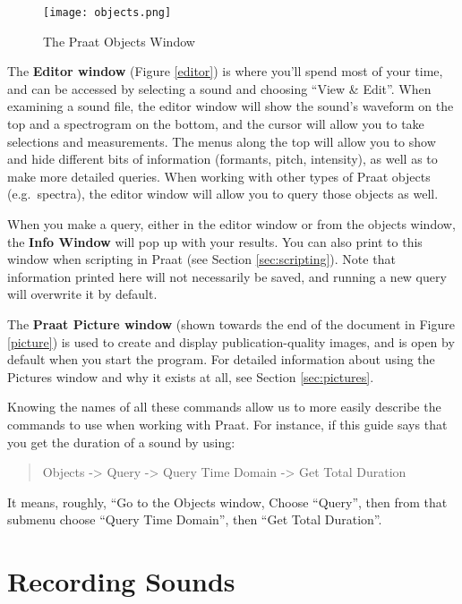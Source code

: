 \documentclass[11pt]{article}
\begin{document}
\begin{figure}
  \centerline{
    \mbox{\texttt{[image: objects.png]}}
  }
    \caption{The Praat Objects Window \label{objects}}
  
  \end{figure}

The \textbf{Editor window} (Figure \ref{editor}) is where you'll spend
most of your time, and can be accessed by selecting a sound and choosing
``View \& Edit''. When examining a sound file, the editor window will
show the sound's waveform on the top and a spectrogram on the bottom,
and the cursor will allow you to take selections and measurements. The
menus along the top will allow you to show and hide different bits of
information (formants, pitch, intensity), as well as to make more
detailed queries. When working with other types of Praat objects
(e.g.~spectra), the editor window will allow you to query those objects
as well.

When you make a query, either in the editor window or from the objects
window, the \textbf{Info Window} will pop up with your results. You can
also print to this window when scripting in Praat (see Section
\ref{sec:scripting}). Note that information printed here will not
necessarily be saved, and running a new query will overwrite it by
default.

The \textbf{Praat Picture window} (shown towards the end of the document
in Figure \ref{picture}) is used to create and display
publication-quality images, and is open by default when you start the
program. For detailed information about using the Pictures window and
why it exists at all, see Section \ref{sec:pictures}.

Knowing the names of all these commands allow us to more easily describe
the commands to use when working with Praat. For instance, if this guide
says that you get the duration of a sound by using:

\begin{quote}
Objects -\textgreater{} Query -\textgreater{} Query Time Domain
-\textgreater{} Get Total Duration
\end{quote}

It means, roughly, ``Go to the Objects window, Choose ``Query'', then
from that submenu choose ``Query Time Domain'', then ``Get Total
Duration''.

\hypertarget{recording-sounds}{%
\section{Recording Sounds}\label{recording-sounds}}
\end{document}

